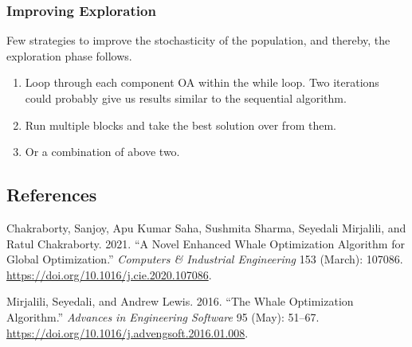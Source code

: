 \hypertarget{improving-exploration}{%
\subsubsection{Improving Exploration}\label{improving-exploration}}

Few strategies to improve the stochasticity of the population, and
thereby, the exploration phase follows.

\begin{enumerate}
\def\labelenumi{\arabic{enumi}.}
\tightlist
\item
  Loop through each component OA within the while loop. Two iterations
  could probably give us results similar to the sequential algorithm.
\item
  Run multiple blocks and take the best solution over from them.
\item
  Or a combination of above two.
\end{enumerate}

\hypertarget{references}{%
\subsection*{References}\label{references}}

\hypertarget{refs}{}
\begin{CSLReferences}{1}{0}
\leavevmode\hypertarget{ref-chakrabortyNovelEnhancedWhale2021}{}%
Chakraborty, Sanjoy, Apu Kumar Saha, Sushmita Sharma, Seyedali
Mirjalili, and Ratul Chakraborty. 2021. {``A Novel Enhanced Whale
Optimization Algorithm for Global Optimization.''} \emph{Computers \&
Industrial Engineering} 153 (March): 107086.
\url{https://doi.org/10.1016/j.cie.2020.107086}.

\leavevmode\hypertarget{ref-mirjaliliWhaleOptimizationAlgorithm2016}{}%
Mirjalili, Seyedali, and Andrew Lewis. 2016. {``The {Whale Optimization
Algorithm}.''} \emph{Advances in Engineering Software} 95 (May): 51--67.
\url{https://doi.org/10.1016/j.advengsoft.2016.01.008}.

\end{CSLReferences}
